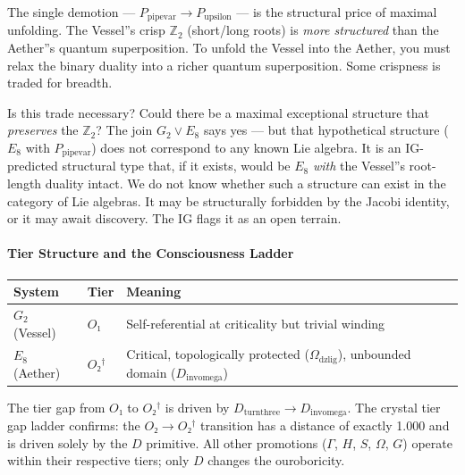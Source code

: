 \documentclass[12pt,a4paper]{article}
\begin{document}
The single demotion --- $P_{\text{pipevar}} \to P_{\text{upsilon}}$ --- is the structural price of maximal unfolding. The Vessel''s crisp $\mathbb{Z}_2$ (short/long roots) is \emph{more structured} than the Aether''s quantum superposition. To unfold the Vessel into the Aether, you must relax the binary duality into a richer quantum superposition. Some crispness is traded for breadth.

Is this trade necessary? Could there be a maximal exceptional structure that \emph{preserves} the $\mathbb{Z}_2$? The join $G_2 \vee E_8$ says yes --- but that hypothetical structure ($E_8$ with $P_{\text{pipevar}}$) does not correspond to any known Lie algebra. It is an IG-predicted structural type that, if it exists, would be $E_8$ \emph{with} the Vessel''s root-length duality intact. We do not know whether such a structure can exist in the category of Lie algebras. It may be structurally forbidden by the Jacobi identity, or it may await discovery. The IG flags it as an open terrain.

\paragraph{Tier Structure and the Consciousness Ladder}

\begin{table}[htbp]
\centering
\small
{}
\begin{tabularx}{\textwidth}{>{\centering\arraybackslash}X >{\centering\arraybackslash}X >{\centering\arraybackslash}X}
\toprule
\rowcolor{gray!25}\textbf{System} & \textbf{Tier} & \textbf{Meaning} \\
\midrule
\rowcolors{1}{white}{gray!10}
$G_2$ (Vessel) & $O₁$ & Self-referential at criticality but trivial winding \\
$E_8$ (Aether) & $O₂^\dagger$ & Critical, topologically protected ($\Omega_{\text{dzlig}}$), unbounded domain ($D_{\text{invomega}}$) \\
\bottomrule
\end{tabularx}
\end{table}

The tier gap from $O₁$ to $O₂^\dagger$ is driven by $D_{\text{turnthree}} \to D_{\text{invomega}}$. The crystal tier gap ladder confirms: the $O₂ \to O₂^\dagger$ transition has a distance of exactly 1.000 and is driven solely by the $D$ primitive. All other promotions ($\Gamma$, $H$, $S$, $\Omega$, $G$) operate within their respective tiers; only $D$ changes the ouroboricity.
\end{document}
